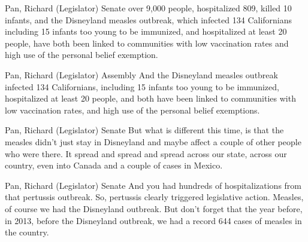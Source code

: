 \begin{result}{9.254614233689319}{Pan, Richard (Legislator) Senate}
over 9,000 people, hospitalized 809, killed 10 infants, and the Disneyland measles outbreak, which infected 134 Californians including 15 infants too young to be immunized, and hospitalized at least 20 people, have both been linked to communities with low vaccination rates and high use of the personal belief exemption.
\end{result}

\begin{result}{9.160509493034045}{Pan, Richard (Legislator) Assembly}
And the Disneyland measles outbreak infected 134 Californians, including 15 infants too young to be immunized, hospitalized at least 20 people, and both have been linked to communities with low vaccination rates, and high use of the personal belief exemptions.
\end{result}

\begin{result}{9.14432800842489}{Pan, Richard (Legislator) Senate}
But what is different this time, is that the measles didn't just stay in Disneyland and maybe affect a couple of other people who were there. It spread and spread and spread across our state, across our country, even into Canada and a couple of cases in Mexico.
\end{result}

\begin{result}{8.860327542507141}{Pan, Richard (Legislator) Senate}
And you had hundreds of hospitalizations from that pertussis outbreak. So, pertussis clearly triggered legislative action. Measles, of course we had the Disneyland outbreak. But don't forget that the year before, in 2013, before the Disneyland outbreak, we had a record 644 cases of measles in the country.
\end{result}

